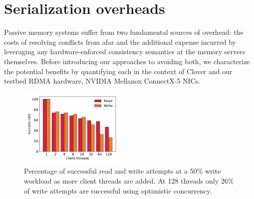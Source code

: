\section{Serialization overheads}




Passive memory systems suffer from two fundamental sources of
overhead: the costs of resolving conflicts from afar and the
additional expense incurred by leveraging any hardware-enforced
consistency semantics at the memory servers themselves.  Before
introducing our approaches to avoiding both, we characterize the
potential benefits by quantifying each in the context of Clover and
our testbed RDMA hardware, NVIDIA Mellanox ConnectX-5 NICs.




\begin{figure}[t]
    \includegraphics[width=0.45\textwidth]{fig/success_rate.pdf}
    
    \caption{Percentage of successful read and write attempts at a 50\% write
    workload as more client threads are added. At 128 threads only 26\% of write
    attempts are successful using optimistic concurrency.}

    \label{fig:success_rate}
\end{figure}

